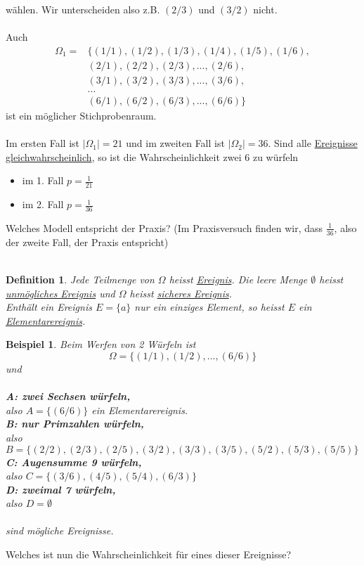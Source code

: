 \documentclass{report}
\newtheorem{mydef}{Definition}
\newtheorem{myexample}{Beispiel}
\begin{document}
wählen. Wir unterscheiden also z.B. $(2/3)$ und $(3/2)$ nicht.\\\\
Auch
\begin{align*}
 \Omega_1 =& \{ (1/1), (1/2), (1/3), (1/4), (1/5), (1/6), \\
 \quad & (2/1), (2/2), (2/3), ..., (2/6), \\
 \quad & (3/1), (3/2), (3/3), ..., (3/6), \\
 \quad & ... \\
 \quad & (6/1), (6/2), (6/3), ..., (6/6) \}
\end{align*}
ist ein möglicher Stichprobenraum.\\\\
Im ersten Fall ist $|\Omega_1| = 21$ und im zweiten Fall ist $|\Omega_2| = 36$. Sind alle \underline{Ereignisse gleichwahrscheinlich}, so ist die Wahrscheinlichkeit zwei 6 zu würfeln
\begin{itemize}
\item im 1. Fall $ p = \frac{1}{21} $
\item im 2. Fall $ p = \frac{1}{36} $
\end{itemize}
Welches Modell entspricht der Praxis? (Im Praxisversuch finden wir, dass $\frac{1}{36}$, also der zweite Fall, der Praxis entspricht)\\\\
\begin{mydef}
Jede Teilmenge von $\Omega$ heisst \underline{Ereignis}. Die leere Menge $\emptyset$ heisst \underline{unmögliches Ereignis} und $\Omega$ heisst \underline{sicheres Ereignis}.\\
Enthält ein Ereignis $E = \{ a \}$ nur ein einziges Element, so heisst $E$ ein \underline{Elementarereignis}.
\end{mydef}
\begin{myexample}
Beim Werfen von 2 Würfeln ist
\begin{equation}
\Omega = \{ (1/1), (1/2), ..., (6/6) \}
\end{equation}
und\\\\
\textbf{A: zwei Sechsen würfeln,}\\
also $A = \{ (6/6) \}$ ein Elementarereignis.\\
\textbf{B: nur Primzahlen würfeln,}\\
also $B = \{ (2/2), (2/3), (2/5), (3/2), (3/3), (3/5), (5/2), (5/3), (5/5) \}$\\
\textbf{C: Augensumme 9 würfeln,}\\
also $C = \{ (3/6), (4/5), (5/4), (6/3) \}$\\
\textbf{D: zweimal 7 würfeln,}\\
also $D = \emptyset $\\\\
sind mögliche Ereignisse.
\end{myexample}
Welches ist nun die Wahrscheinlichkeit für eines dieser Ereignisse?
\end{document}
